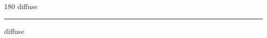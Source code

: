 
\begin{frame}
\begin{center}
\begin{turn}{180}
{\fontsize{2.5cm}{1em}\selectfont diffuse}
\end{turn}
\vspace{1em}\par  
\hrule
\vspace{1em}\par  
{\fontsize{2.5cm}{1em}\selectfont diffuse}
\end{center}
\end{frame}
